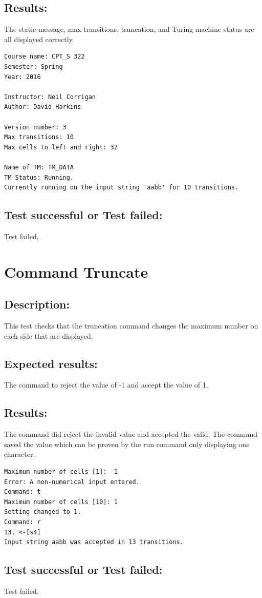\documentclass{report}
\begin{document}
\section{Results:} The static message, max transitions, truncation, and Turing machine status are all displayed correctly.
\begin{verbatim}
Course name: CPT_S 322
Semester: Spring
Year: 2016

Instructor: Neil Corrigan
Author: David Harkins

Version number: 3
Max transitions: 10
Max cells to left and right: 32

Name of TM: TM_DATA
TM Status: Running.
Currently running on the input string 'aabb' for 10 transitions.
\end{verbatim}
\section{Test successful or Test failed:} Test failed.
\pagebreak



\chapter{Command Truncate}
\section{Description:} This test checks that the truncation command changes the maximum number on each side that are displayed.
\section{Expected results:} The command to reject the value of -1 and accept the value of 1.

\section{Results:} The command did reject the invalid value and accepted the valid. The command saved the value which can be proven by the run command only displaying one character.
\begin{verbatim}
Maximum number of cells [1]: -1
Error: A non-numerical input entered.
Command: t
Maximum number of cells [10]: 1
Setting changed to 1.
Command: r
13. <-[s4]
Input string aabb was accepted in 13 transitions.
\end{verbatim}
\section{Test successful or Test failed:} Test failed.
\pagebreak
\end{document}
